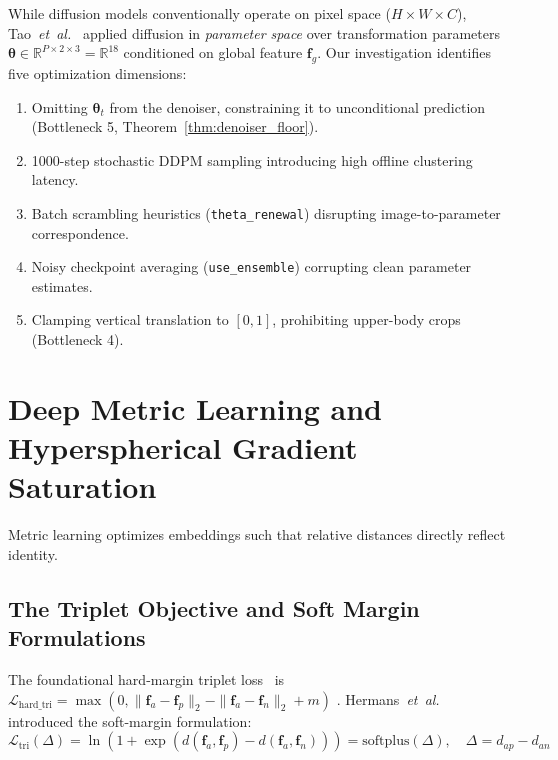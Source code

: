 While diffusion models conventionally operate on pixel space ($H \times W \times C$), Tao~\textit{et~al.}~\cite{tao2024unsupervised} applied diffusion in \textit{parameter space} over transformation parameters $\boldsymbol{\theta} \in \mathbb{R}^{P \times 2 \times 3} = \mathbb{R}^{18}$ conditioned on global feature $\mathbf{f}_g$. Our investigation identifies five optimization dimensions:
\begin{enumerate}[leftmargin=*]
    \item Omitting $\boldsymbol{\theta}_t$ from the denoiser, constraining it to unconditional prediction (Bottleneck 5, Theorem~\ref{thm:denoiser_floor}).
    \item 1000-step stochastic DDPM sampling introducing high offline clustering latency.
    \item Batch scrambling heuristics (\texttt{theta\_renewal}) disrupting image-to-parameter correspondence.
    \item Noisy checkpoint averaging (\texttt{use\_ensemble}) corrupting clean parameter estimates.
    \item Clamping vertical translation to $[0, 1]$, prohibiting upper-body crops (Bottleneck 4).
\end{enumerate}

\section{Deep Metric Learning and Hyperspherical Gradient Saturation}
\label{sec:lit_metric_learning}

Metric learning optimizes embeddings such that relative distances directly reflect identity.

\subsection{The Triplet Objective and Soft Margin Formulations}
\label{subsec:triplet_dynamics}

The foundational hard-margin triplet loss~\cite{hermans2017triplet} is $\mathcal{L}_{\text{hard\_tri}} = \max(0, \|\mathbf{f}_a - \mathbf{f}_p\|_2 - \|\mathbf{f}_a - \mathbf{f}_n\|_2 + m)$ \label{eq:lit_hard_triplet}. Hermans~\textit{et~al.}~\cite{hermans2017triplet} introduced the soft-margin formulation:
\begin{equation}
\label{eq:lit_soft_triplet}
\mathcal{L}_{\text{tri}}(\Delta) = \ln\left(1 + \exp\left(d(\mathbf{f}_a, \mathbf{f}_p) - d(\mathbf{f}_a, \mathbf{f}_n)\right)\right) = \mathrm{softplus}(\Delta), \quad \Delta = d_{ap} - d_{an}
\end{equation}

